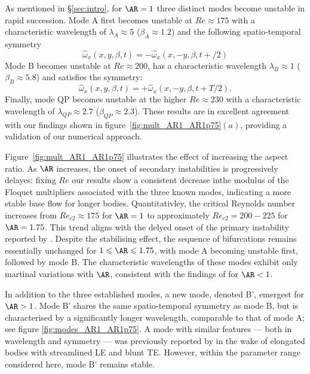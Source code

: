 %
As mentioned in \S\ref{sec:intro}, for $\AR=1$ three distinct modes become unstable in rapid succession. Mode A first becomes unstable at $Re \approx 175$ with a characteristic wavelength of $\lambda_A \approx 5$ ($\beta_A \approx 1.2$) and the following spatio-temporal symmetry 
%
\begin{equation}
  \hat{\omega}_x(x,y,\beta,t) = - \hat{\omega}_x(x,-y,\beta,t+/2)
\end{equation}
%
Mode B becomes unstable at $Re \approx 200$, has a characteristic wavelength $\lambda_B \approx 1$ ($\beta_B \approx 5.8$) and satisfies the symmetry:
%
\begin{equation}
  \hat{\omega}_x(x,y,\beta,t) = + \hat{\omega}_x(x,-y,\beta,t+T/2).
\end{equation}
%
Finally, mode QP becomes unstable at the higher $Re \approx 230$ with a characteristic wavelength of $\lambda_{QP} \approx 2.7$ ($\beta_{QP} \approx 2.3$). These results are in excellent agreement with our findings shown in figure~\ref{fig:mult_AR1_AR1p75}$(a)$, providing a validation of our numerical approach.

Figure~\ref{fig:mult_AR1_AR1p75} illustrates the effect of increasing the aspect ratio. As $\AR$ increases, the onset of secondary instabilities is progressively delayes: fixing $Re$ our results show a consistent decrease inthe modulus of the Floquet multipliers associated with the three known modes, indicating a more stable base flow for longer bodies. Quantitativley, the critical Reynolds number increases from $Re_{c2} \approx 175$ for $\AR=1$ to approximately $Re_{c2} =200-225$ for $\AR=1.75$. This trend aligns with the delyed onset of the primary instability reported by \cite{chiarini-quadrio-auteri-2021}. Despite the stabilising effect, the sequence of bifurcations remains essentially unchanged for $1 \le \AR \le 1.75$, with mode A becoming unstable first, followed by mode B. The characteristic wavelengths of these modes exhibit only martinal variations with $\AR$, consistent with the findings of \cite{choi-yang-2014} for $\AR<1$.

In addition to the three established modes, a new mode, denoted B', emergest for $\AR>1$. Mode B' shares the same spatio-temporal symmetry as mode B, but is characterised by a significantly longer wavelength, comparable to that of mode A; see figure \ref{fig:modes_AR1_AR1p75}. A mode with similar features --- both in wavelength and symmetry --- was previously reported by \cite{ryan-etal-2006} in the wake of elongated bodies with streamlined LE and blunt TE. However, within the parameter range considered here, mode B' remains stable.


